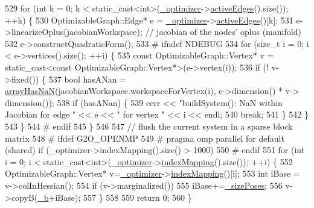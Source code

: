 \begin{DoxyCode}
529   \textcolor{keywordflow}{for} (\textcolor{keywordtype}{int} k = 0; k < static\_cast<int>(\hyperlink{classg2o_1_1Solver_aff3275985d996329df15070348c21292}{\_optimizer}->\hyperlink{classg2o_1_1SparseOptimizer_aef20b7dd401862d572a851349d1bc124}{activeEdges}().size()); ++k) \{
530     OptimizableGraph::Edge* e = \hyperlink{classg2o_1_1Solver_aff3275985d996329df15070348c21292}{\_optimizer}->\hyperlink{classg2o_1_1SparseOptimizer_aef20b7dd401862d572a851349d1bc124}{activeEdges}()[k];
531     e->linearizeOplus(jacobianWorkspace); \textcolor{comment}{// jacobian of the nodes' oplus (manifold)}
532     e->constructQuadraticForm();
533 \textcolor{preprocessor}{#  ifndef NDEBUG}
534     \textcolor{keywordflow}{for} (\textcolor{keywordtype}{size\_t} i = 0; i < e->vertices().size(); ++i) \{
535       \textcolor{keyword}{const} OptimizableGraph::Vertex* v = \textcolor{keyword}{static\_cast<}\textcolor{keyword}{const }OptimizableGraph::Vertex*\textcolor{keyword}{>}(e->vertex(i));
536       \textcolor{keywordflow}{if} (! v->fixed()) \{
537         \textcolor{keywordtype}{bool} hasANan = \hyperlink{namespaceg2o_a123840a60e0d1dde58088d15a1e1fffa}{arrayHasNaN}(jacobianWorkspace.workspaceForVertex(i), e->dimension() * v->
      dimension());
538         \textcolor{keywordflow}{if} (hasANan) \{
539           cerr << \textcolor{stringliteral}{"buildSystem(): NaN within Jacobian for edge "} << e << \textcolor{stringliteral}{" for vertex "} << i << endl;
540           \textcolor{keywordflow}{break};
541         \}
542       \}
543     \}
544 \textcolor{preprocessor}{#  endif}
545   \}
546 
547   \textcolor{comment}{// flush the current system in a sparse block matrix}
548 \textcolor{preprocessor}{# ifdef G2O\_OPENMP}
549 \textcolor{preprocessor}{# pragma omp parallel for default (shared) if (\_optimizer->indexMapping().size() > 1000)}
550 \textcolor{preprocessor}{# endif}
551   \textcolor{keywordflow}{for} (\textcolor{keywordtype}{int} i = 0; i < static\_cast<int>(\hyperlink{classg2o_1_1Solver_aff3275985d996329df15070348c21292}{\_optimizer}->\hyperlink{classg2o_1_1SparseOptimizer_a5e98a5f879f04c013b20f9c39a9057da}{indexMapping}().size()); ++i) \{
552     OptimizableGraph::Vertex* v=\hyperlink{classg2o_1_1Solver_aff3275985d996329df15070348c21292}{\_optimizer}->\hyperlink{classg2o_1_1SparseOptimizer_a5e98a5f879f04c013b20f9c39a9057da}{indexMapping}()[i];
553     \textcolor{keywordtype}{int} iBase = v->colInHessian();
554     \textcolor{keywordflow}{if} (v->marginalized())
555       iBase+=\hyperlink{classg2o_1_1BlockSolver_a39ec000379885ce09cdd8c23ab6d4567}{\_sizePoses};
556     v->copyB(\hyperlink{classg2o_1_1Solver_a52c92c9bf5db0da3322da3a02dbeb245}{\_b}+iBase);
557   \}
558 
559   \textcolor{keywordflow}{return} 0;
560 \}
\end{DoxyCode}
